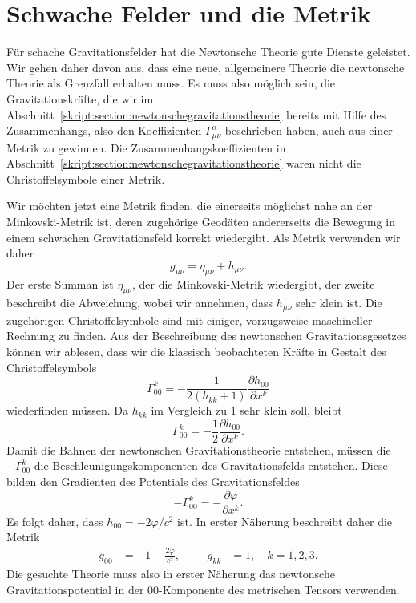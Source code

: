\section{Schwache Felder und die Metrik}
Für schache Gravitationsfelder hat die Newtonsche Theorie gute Dienste
geleistet. 
Wir gehen daher davon aus, dass eine neue, allgemeinere Theorie die
newtonsche Theorie als Grenzfall erhalten muss.
Es muss also möglich sein, die Gravitationskräfte, die wir im 
Abschnitt~\ref{skript:section:newtonschegravitationstheorie} bereits
mit Hilfe des Zusammenhangs, also den Koeffizienten $\Gamma^\alpha_{\mu\nu}$
beschrieben haben, auch aus einer Metrik zu gewinnen.
Die Zusammenhangskoeffizienten in
Abschnitt~\ref{skript:section:newtonschegravitationstheorie} waren nicht
die Christoffelsymbole einer Metrik.

Wir möchten jetzt eine Metrik finden, die einerseits möglichst nahe
an der Minkovski-Metrik ist, deren zugehörige Geodäten andererseits die
Bewegung in einem schwachen Gravitationsfeld korrekt wiedergibt.
Als Metrik verwenden wir daher
\[
g_{\mu\nu}=\eta_{\mu\nu} + h_{\mu\nu}.
\]
Der erste Summan ist $\eta_{\mu\nu}$, der die Minkovski-Metrik 
wiedergibt, der zweite beschreibt die Abweichung,
wobei wir annehmen, dass $h_{\mu\nu}$ sehr klein ist.
Die zugehörigen Christoffelsymbole sind mit einiger, vorzugsweise
maschineller Rechnung zu finden.
Aus der Beschreibung des newtonschen Gravitationsgesetzes können wir
ablesen, dass wir die klassisch beobachteten Kräfte in Gestalt
des Christoffelsymbols
\[
\Gamma^{k}_{00}
=
-\frac{1}{2(h_{kk} + 1)}\frac{\partial h_{00}}{\partial x^k}
\]
wiederfinden müssen.
Da $h_{kk}$ im Vergleich zu $1$ sehr klein soll, bleibt
\[
\Gamma^{k}_{00}
=
-\frac{1}{2}\frac{\partial h_{00}}{\partial x^k}.
\]
Damit die Bahnen der newtonschen Gravitationstheorie entstehen, müssen
die $-\Gamma^k_{00}$ die Beschleunigungskomponenten des Gravitationsfelds
entstehen.
Diese bilden den Gradienten des Potentials des Gravitationsfeldes
\[
-\Gamma^k_{00} = -\frac{\partial\varphi}{\partial x^k}.
\]
Es folgt daher, dass $h_{00}=-2\varphi/c^2$ ist.
In erster Näherung beschreibt daher die Metrik
\begin{equation}
\begin{aligned}
g_{00} &= -1 -\frac{2\varphi}{c^2},
&&&
g_{kk} &= 1,\quad k=1,2,3.
\end{aligned}
\label{skript:gravitation:naeherung}
\end{equation}
Die gesuchte Theorie muss also in erster Näherung das newtonsche
Gravitationspotential in der $00$-Komponente des metrischen Tensors
verwenden.

